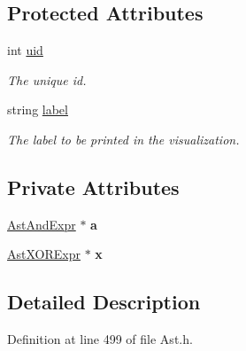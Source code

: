 \subsection*{Protected Attributes}
\begin{DoxyCompactItemize}
\item 
\hypertarget{classAST_a847b778f1c3dd5a19de32de432ee6e15}{int \hyperlink{classAST_a847b778f1c3dd5a19de32de432ee6e15}{uid}}\label{classAST_a847b778f1c3dd5a19de32de432ee6e15}

\begin{DoxyCompactList}\small\item\em The unique id. \end{DoxyCompactList}\item 
\hypertarget{classAST_ab2e239ccc0688d2341724432ff5a1a31}{string \hyperlink{classAST_ab2e239ccc0688d2341724432ff5a1a31}{label}}\label{classAST_ab2e239ccc0688d2341724432ff5a1a31}

\begin{DoxyCompactList}\small\item\em The label to be printed in the visualization. \end{DoxyCompactList}\end{DoxyCompactItemize}
\subsection*{Private Attributes}
\begin{DoxyCompactItemize}
\item 
\hypertarget{classAstXORExpr_a933fb23a404603025b68d108083abea8}{\hyperlink{classAstAndExpr}{Ast\-And\-Expr} $\ast$ {\bfseries a}}\label{classAstXORExpr_a933fb23a404603025b68d108083abea8}

\item 
\hypertarget{classAstXORExpr_af9a4edc455aa254fc051444a6028890d}{\hyperlink{classAstXORExpr}{Ast\-X\-O\-R\-Expr} $\ast$ {\bfseries x}}\label{classAstXORExpr_af9a4edc455aa254fc051444a6028890d}

\end{DoxyCompactItemize}


\subsection{Detailed Description}


Definition at line 499 of file Ast.\-h.



